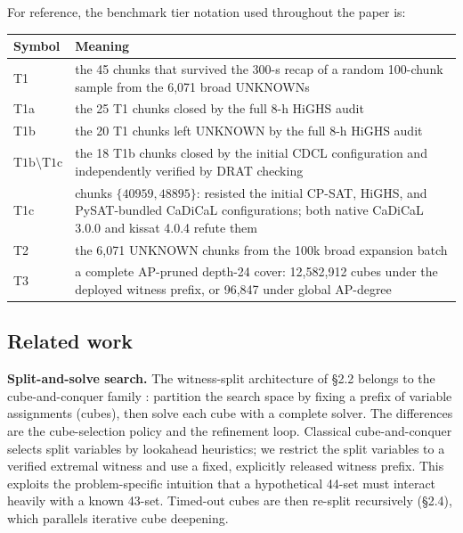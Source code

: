 For reference, the benchmark tier notation used throughout the paper is:

{\def\LTcaptype{none} %
\begin{longtable}[]{@{}l
  >{\raggedright\arraybackslash}p{}@{}}
\toprule\noalign{}
Symbol & Meaning \\
\midrule\noalign{}
\endhead
\bottomrule\noalign{}
\endlastfoot
T1 & the 45 chunks that survived the 300-s recap of a random 100-chunk sample from the 6,071 broad UNKNOWNs \\
T1a & the 25 T1 chunks closed by the full 8-h HiGHS audit \\
T1b & the 20 T1 chunks left UNKNOWN by the full 8-h HiGHS audit \\
$\mathrm{T1b}\setminus\mathrm{T1c}$ & the 18 T1b chunks closed by the initial CDCL configuration and independently verified by DRAT checking \\
T1c & chunks $\{40959,48895\}$: resisted the initial CP-SAT, HiGHS, and PySAT-bundled CaDiCaL configurations; both native CaDiCaL 3.0.0 and kissat 4.0.4 refute them \\
T2 & the 6,071 UNKNOWN chunks from the 100k broad expansion batch \\
T3 & a complete AP-pruned depth-24 cover: 12,582,912 cubes under the deployed witness prefix, or 96,847 under global AP-degree \\
\end{longtable}
}

\subsection{Related work}\label{related-work}

\textbf{Split-and-solve search.} The witness-split architecture of §2.2
belongs to the cube-and-conquer family
\cite{heule-kullmann-wieringa-biere-2012}: partition the search space by
fixing a prefix of variable assignments (cubes), then solve each cube with
a complete solver. The differences are the cube-selection policy and the
refinement loop. Classical cube-and-conquer selects split variables by
lookahead heuristics; we restrict the split variables to a verified extremal
witness and use a fixed, explicitly released witness prefix. This exploits
the problem-specific intuition that a hypothetical 44-set must interact
heavily with a known 43-set. Timed-out cubes are then re-split
recursively (§2.4), which parallels iterative cube deepening.

